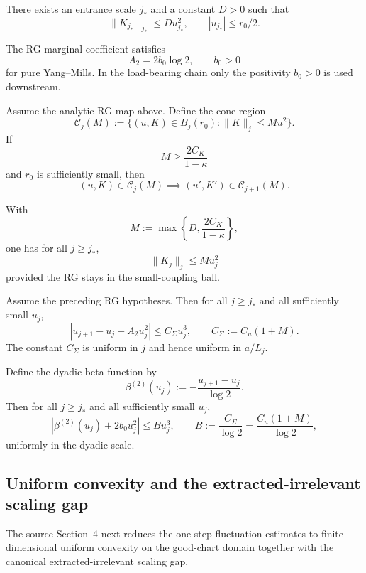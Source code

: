 \documentclass[preprint,aip,jmp,amsmath,amssymb,nofootinbib]{revtex4-2}
\begin{document}
\begin{proposition}
There exists an entrance scale $j_\ast$ and a constant $D>0$ such that
\[
\|K_{j_\ast}\|_{j_\ast}\le D u_{j_\ast}^2,
\qquad
|u_{j_\ast}|\le r_0/2.
\]
\end{proposition}

\begin{proposition}
The RG marginal coefficient satisfies
\[
A_2 = 2b_0 \log 2,
\qquad b_0>0
\]
for pure Yang--Mills. In the load-bearing chain only the positivity $b_0>0$ is used downstream.
\end{proposition}

\begin{lemma}
Assume the analytic RG map above. Define the cone region
\[
\mathcal C_j(M):=\{(u,K)\in B_j(r_0): \|K\|_j\le M u^2\}.
\]
If
\[
M\ge \frac{2C_K}{1-\kappa}
\]
and $r_0$ is sufficiently small, then
\[
(u,K)\in \mathcal C_j(M)\implies (u',K')\in \mathcal C_{j+1}(M).
\]
\end{lemma}

\begin{corollary}
With
\[
M:=\max\!\left\{D,\frac{2C_K}{1-\kappa}\right\},
\]
one has for all $j\ge j_\ast$,
\[
\|K_j\|_j \le M u_j^2
\]
provided the RG stays in the small-coupling ball.
\end{corollary}

\begin{theorem}
Assume the preceding RG hypotheses. Then for all $j\ge j_\ast$ and all sufficiently small $u_j$,
\[
|u_{j+1}-u_j-A_2u_j^2|\le C_\Sigma u_j^3,
\qquad
C_\Sigma:=C_u(1+M).
\]
The constant $C_\Sigma$ is uniform in $j$ and hence uniform in $a/L_j$.
\end{theorem}

\begin{corollary}
Define the dyadic beta function by
\[
\beta^{(2)}(u_j):=-\frac{u_{j+1}-u_j}{\log 2}.
\]
Then for all $j\ge j_\ast$ and all sufficiently small $u_j$,
\[
|\beta^{(2)}(u_j)+2b_0u_j^2| \le Bu_j^3,
\qquad
B:=\frac{C_\Sigma}{\log 2}
= \frac{C_u(1+M)}{\log 2},
\]
uniformly in the dyadic scale.
\end{corollary}

\subsection{Uniform convexity and the extracted-irrelevant scaling gap}
The source Section~4 next reduces the one-step fluctuation estimates to finite-dimensional uniform convexity on the good-chart domain together with the canonical extracted-irrelevant scaling gap.
\end{document}
